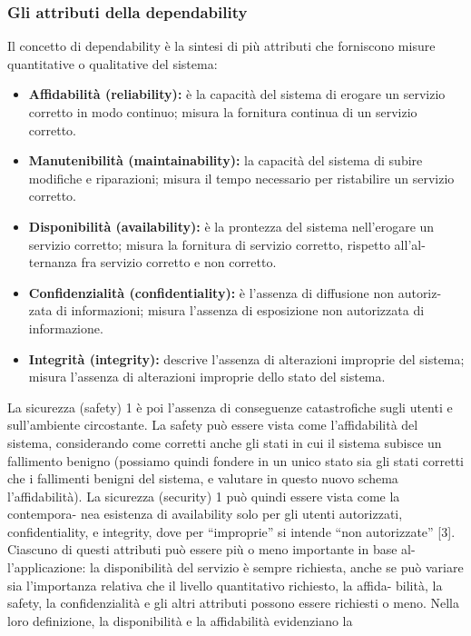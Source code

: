 \documentclass[14pt]{extarticle}
\begin{document}
\subsubsection{Gli attributi della dependability}
Il concetto di dependability è la sintesi di più attributi che forniscono misure
quantitative o qualitative del sistema:
\begin{itemize}
\item \textbf{Affidabilità (reliability):} è la capacità del sistema di erogare un servizio
corretto in modo continuo; misura la fornitura continua di un servizio
corretto.
\item \textbf{Manutenibilità (maintainability):} la capacità del sistema di subire modifiche e riparazioni; misura il tempo necessario per ristabilire un servizio
corretto.
\item \textbf{Disponibilità (availability):} è la prontezza del sistema nell’erogare un
servizio corretto; misura la fornitura di servizio corretto, rispetto all’al-
ternanza fra servizio corretto e non corretto.
\item \textbf{Confidenzialità (confidentiality):} è l’assenza di diffusione non autoriz-
zata di informazioni; misura l’assenza di esposizione non autorizzata di
informazione.
\item \textbf{Integrità (integrity):} descrive l’assenza di alterazioni improprie del sistema; misura l’assenza di alterazioni improprie dello stato del sistema.

\end{itemize}
La sicurezza (safety) 1 è poi l’assenza di conseguenze catastrofiche sugli
utenti e sull’ambiente circostante. La safety può essere vista come l’affidabilità
del sistema, considerando come corretti anche gli stati in cui il sistema subisce
un fallimento benigno (possiamo quindi fondere in un unico stato sia gli stati
corretti che i fallimenti benigni del sistema, e valutare in questo nuovo schema
l’affidabilità).
La sicurezza (security) 1 può quindi essere vista come la contempora-
nea esistenza di availability solo per gli utenti autorizzati, confidentiality, e
integrity, dove per “improprie” si intende “non autorizzate” [3].
Ciascuno di questi attributi può essere più o meno importante in base al-
l’applicazione: la disponibilità del servizio è sempre richiesta, anche se può
variare sia l’importanza relativa che il livello quantitativo richiesto, la affida-
bilità, la safety, la confidenzialità e gli altri attributi possono essere richiesti
o meno. Nella loro definizione, la disponibilità e la affidabilità evidenziano la
\end{document}
